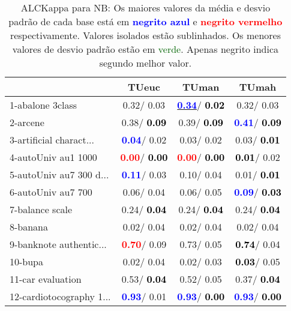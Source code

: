 \begin{table}[h]
\caption{ALCKappa para NB: Os maiores valores da média e desvio padrão de cada base está em \textcolor{blue}{\textbf{negrito azul}} e \textcolor{red}{\textbf{negrito vermelho}} respectivamente. Valores isolados estão sublinhados. Os menores valores de desvio padrão estão em \textcolor{darkgreen}{verde}. Apenas negrito indica segundo melhor valor.}
\begin{center}\begin{tabular}{lc|c|c}
 & TUeuc & TUman & TUmah\\ \hline 1-abalone 3class &   0.32/  0.03 & \underline{\textcolor{blue}{\textbf{  0.34}}}/\textcolor{black}{\textbf{  0.02}} &   0.32/  0.03 \\
2-arcene &   0.38/\textcolor{black}{\textbf{  0.09}} &   0.39/\textcolor{black}{\textbf{  0.09}} & \textcolor{blue}{\textbf{  0.41}}/\textcolor{black}{\textbf{  0.09}} \\
3-artificial charact... & \textcolor{blue}{\textbf{  0.04}}/  0.02 &   0.03/  0.02 &   0.03/\textcolor{black}{\textbf{  0.01}} \\
4-autoUniv au1 1000 & \textcolor{red}{\textbf{  0.00}}/\textcolor{black}{\textbf{  0.00}} & \textcolor{red}{\textbf{  0.00}}/\textcolor{black}{\textbf{  0.00}} & \textcolor{black}{\textbf{  0.01}}/  0.02 \\
5-autoUniv au7 300 d... & \textcolor{blue}{\textbf{  0.11}}/  0.03 &   0.10/  0.04 &   0.01/\textcolor{black}{\textbf{  0.01}} \\
6-autoUniv au7 700 &   0.06/  0.04 &   0.06/  0.05 & \textcolor{blue}{\textbf{  0.09}}/\textcolor{black}{\textbf{  0.03}} \\
7-balance scale &   0.24/\textcolor{black}{\textbf{  0.04}} &   0.24/\textcolor{black}{\textbf{  0.04}} &   0.24/\textcolor{black}{\textbf{  0.04}} \\ \hline
8-banana &   0.02/  0.04 &   0.02/  0.04 &   0.02/  0.04 \\
9-banknote authentic... & \textcolor{red}{\textbf{  0.70}}/  0.09 &   0.73/  0.05 & \textcolor{black}{\textbf{  0.74}}/  0.04 \\
10-bupa &   0.02/  0.04 &   0.02/  0.03 & \textcolor{black}{\textbf{  0.03}}/  0.05 \\
11-car evaluation &   0.53/\textcolor{black}{\textbf{  0.04}} &   0.52/  0.05 &   0.37/\textcolor{black}{\textbf{  0.04}} \\
12-cardiotocography 1... & \textcolor{blue}{\textbf{  0.93}}/  0.01 & \textcolor{blue}{\textbf{  0.93}}/\textcolor{black}{\textbf{  0.00}} & \textcolor{blue}{\textbf{  0.93}}/\textcolor{black}{\textbf{  0.00}} \\

\end{tabular}
\end{center}
\end{table}
